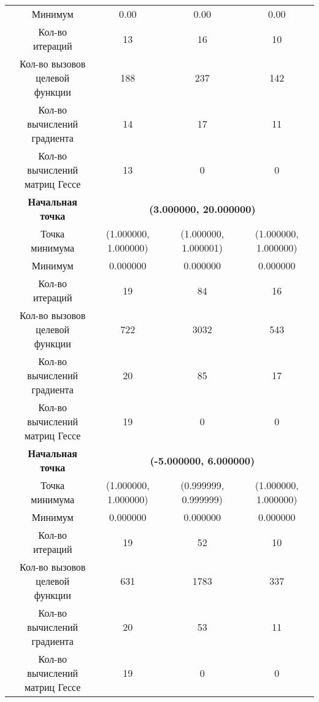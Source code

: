 \begin{table}[H]
\begin{tabular}{|c|c|c|c|c|}
	\cline{2-5}
	&Минимум &0.00 &0.00 &0.00 \\ 
	\cline{2-5}
	&Кол-во итераций &13 &16 &10 \\ 
	\cline{2-5}
	&\makecell{Кол-во вызовов\\целевой функции} &188 &237 &142 \\ 
	\cline{2-5}
	&\makecell{Кол-во вычислений\\градиента} &14 &17 &11 \\ 
	\cline{2-5}
	&\makecell{Кол-во вычислений\\матриц Гессе} &13 &0 &0 \\ 
	\cline{2-5}
	\hline
	\multirow{12}{*}{\rotatebox[origin=c]{90}{$\varepsilon = 1e-06$}}&\textbf{Начальная точка} &\multicolumn{3}{c|}{\textbf{(3.000000, 20.000000)}}\\
	\cline{2-5}
	&Точка минимума &(1.000000, 1.000000) &(1.000000, 1.000001) &(1.000000, 1.000000) \\ 
	\cline{2-5}
	&Минимум &0.000000 &0.000000 &0.000000 \\ 
	\cline{2-5}
	&Кол-во итераций &19 &84 &16 \\ 
	\cline{2-5}
	&\makecell{Кол-во вызовов\\целевой функции} &722 &3032 &543 \\ 
	\cline{2-5}
	&\makecell{Кол-во вычислений\\градиента} &20 &85 &17 \\ 
	\cline{2-5}
	&\makecell{Кол-во вычислений\\матриц Гессе} &19 &0 &0 \\ 
	\cline{2-5}
\cline{2-5}&\textbf{Начальная точка} &\multicolumn{3}{c|}{\textbf{(-5.000000, 6.000000)}}\\
	\cline{2-5}
	&Точка минимума &(1.000000, 1.000000) &(0.999999, 0.999999) &(1.000000, 1.000000) \\ 
	\cline{2-5}
	&Минимум &0.000000 &0.000000 &0.000000 \\ 
	\cline{2-5}
	&Кол-во итераций &19 &52 &10 \\ 
	\cline{2-5}
	&\makecell{Кол-во вызовов\\целевой функции} &631 &1783 &337 \\ 
	\cline{2-5}
	&\makecell{Кол-во вычислений\\градиента} &20 &53 &11 \\ 
	\cline{2-5}
	&\makecell{Кол-во вычислений\\матриц Гессе} &19 &0 &0 \\ 
	\cline{2-5}
	\hline

\end{tabular}
\end{table}



